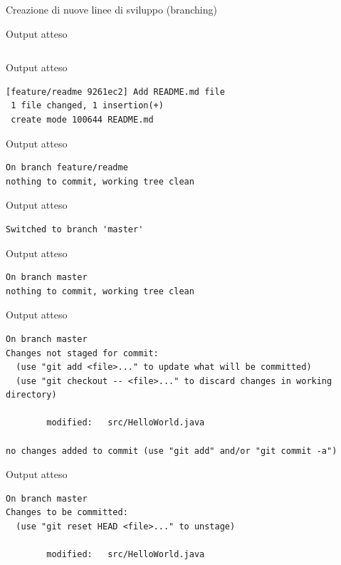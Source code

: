 \documentclass[xcolor=dvipsnames,presentation]{beamer}
\begin{document}
\begin{frame}{Creazione di nuove linee di sviluppo (branching)}
\begin{block}{Output atteso}
\begin{Verbatim}[fontsize=\scriptsize]
        \end{Verbatim}
    \end{block}
    \begin{block}{Output atteso}
        \begin{Verbatim}[fontsize=\scriptsize]
[feature/readme 9261ec2] Add README.md file
 1 file changed, 1 insertion(+)
 create mode 100644 README.md
        \end{Verbatim}
    \end{block}
    \begin{block}{Output atteso}
        \begin{Verbatim}[fontsize=\scriptsize]
On branch feature/readme
nothing to commit, working tree clean
        \end{Verbatim}
    \end{block}
    \begin{block}{Output atteso}
        \begin{Verbatim}[fontsize=\scriptsize]
Switched to branch 'master'
        \end{Verbatim}
    \end{block}
    \begin{block}{Output atteso}
        \begin{Verbatim}[fontsize=\scriptsize]
On branch master
nothing to commit, working tree clean
        \end{Verbatim}
    \end{block}
    \begin{block}{Output atteso}
        \begin{Verbatim}[fontsize=\scriptsize]
On branch master
Changes not staged for commit:
  (use "git add <file>..." to update what will be committed)
  (use "git checkout -- <file>..." to discard changes in working directory)

        modified:   src/HelloWorld.java

no changes added to commit (use "git add" and/or "git commit -a")
        \end{Verbatim}
    \end{block}
    \begin{block}{Output atteso}
        \begin{Verbatim}[fontsize=\scriptsize]
On branch master
Changes to be committed:
  (use "git reset HEAD <file>..." to unstage)

        modified:   src/HelloWorld.java


\end{Verbatim}
\end{block}
\end{frame}
\end{document}
